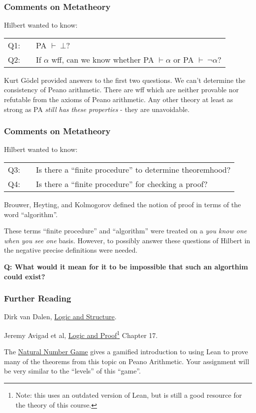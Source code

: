 \documentclass{beamer}
\theoremstyle{indentDefn} \newtheorem{defn}[]{Definition}
\begin{document}
\begin{frame}
	\frametitle{Comments on Metatheory}

	Hilbert wanted to know: 

	\begin{tabular}{r c l}
		Q1: & & PA $\vdash \ \bot$? \\
		Q2: & & If $\alpha$ wff, can we know whether PA $\vdash \alpha$ or PA $\vdash \ \lnot \alpha$?
	\end{tabular}		

	Kurt G\"{o}del provided answers to the first two questions. We can't determine the consistency of Peano arithmetic. There are wff which are neither provable nor refutable from the axioms of Peano arithmetic. Any other theory at least as strong as PA \emph{still has these properties} - they are unavoidable.

\end{frame}

\begin{frame}
	\frametitle{Comments on Metatheory}
	Hilbert wanted to know:

	\begin{tabular}{r c l}
		Q3: & & Is there a ``finite procedure'' to determine theoremhood? \\
		Q4: & & Is there a ``finite procedure'' for checking a proof? 
	\end{tabular}

	Brouwer, Heyting, and Kolmogorov defined the notion of proof in terms of the word ``algorithm''.
	
	These terms ``finite procedure'' and ``algorithm'' were treated on a \emph{you know one when you see one} basis. However, to possibly answer these questions of Hilbert in the negative precise definitions were needed. 

	{\bf Q: What would it mean for it to be impossible that such an algorthim could exist?}
\end{frame}

\begin{frame}
	\frametitle{Further Reading}

	Dirk van Dalen, \href{https://libcat.canterbury.ac.nz/Record/112862}{Logic and Structure}. 

	\vspace{10mm}

	Jeremy Avigad et al, \href{https://leanprover.github.io/logic_and_proof_lean3/index.html}{Logic and Proof}\footnote{Note: this uses an outdated version of Lean, but is still a good resource for the theory of this course.} Chapter 17.

	\vspace{10mm}

	The \href{https://adam.math.hhu.de/\#/g/leanprover-community/nng4}{Natural Number Game} gives a gamified introduction to using Lean to prove many of the theorems from this topic on Peano Arithmetic. Your assignment will be very similar to the ``levels'' of this ``game''.

\end{frame}
\end{document}
